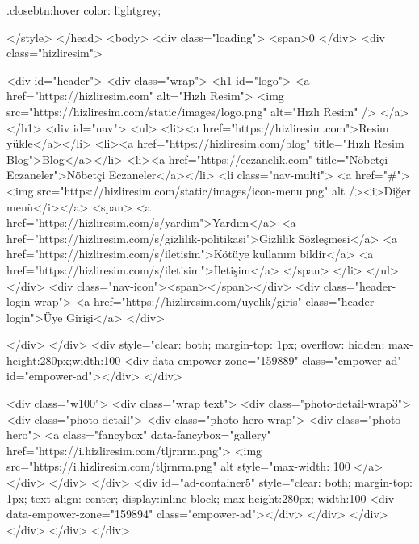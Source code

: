 .closebtn:hover {
  color: lightgrey;
}

	</style>
</head>
<body>
<div class="loading">
<span>0%
</div>
<div class="hizliresim">

<div id="header">
<div class="wrap">
<h1 id="logo">
<a href="https://hizliresim.com" alt="Hızlı Resim">
<img src="https://hizliresim.com/static/images/logo.png" alt="Hızlı Resim" />
</a>
</h1>
<div id="nav">
<ul>
<li><a href="https://hizliresim.com">Resim yükle</a></li>
<li><a href="https://hizliresim.com/blog" title="Hızlı Resim Blog">Blog</a></li>
<li><a href="https://eczanelik.com" title="Nöbetçi Eczaneler">Nöbetçi Eczaneler</a></li>
<li class="nav-multi">
<a href="#"><img src="https://hizliresim.com/static/images/icon-menu.png" alt /><i>Diğer menü</i></a>
<span>
<a href="https://hizliresim.com/s/yardim">Yardım</a>
<a href="https://hizliresim.com/s/gizlilik-politikasi">Gizlilik Sözleşmesi</a>
<a href="https://hizliresim.com/s/iletisim">Kötüye kullanım bildir</a>
<a href="https://hizliresim.com/s/iletisim">İletişim</a>
</span>
</li>
</ul>
</div>
<div class="nav-icon"><span></span></div>
<div class="header-login-wrap">
<a href="https://hizliresim.com/uyelik/giris" class="header-login">Üye Girişi</a>
</div>

</div>
</div>
<div style="clear: both; margin-top: 1px; overflow: hidden; max-height:280px;width:100%
<div data-empower-zone="159889" class="empower-ad" id="empower-ad"></div>
</div>

<div class="w100">
<div class="wrap text">
<div class="photo-detail-wrap3">
<div class="photo-detail">
<div class="photo-hero-wrap">
<div class="photo-hero">
<a class="fancybox" data-fancybox="gallery" href="https://i.hizliresim.com/tljrnrm.png">
<img src="https://i.hizliresim.com/tljrnrm.png" alt style="max-width: 100%
</a>
</div>
</div>
</div>
<div id="ad-container5" style="clear: both; margin-top: 1px; text-align: center; display:inline-block; max-height:280px; width:100%
<div data-empower-zone="159894" class="empower-ad"></div>
</div>
</div>
</div>
</div>
</div>

